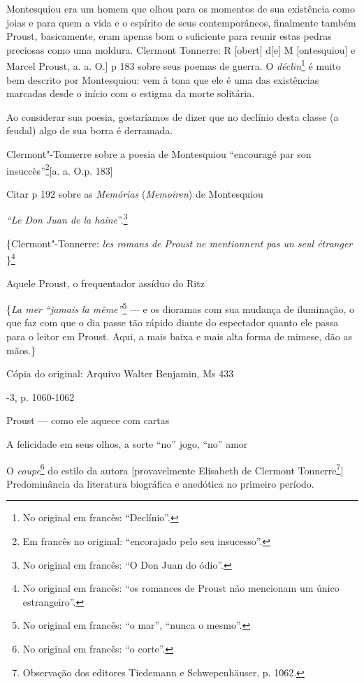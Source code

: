 Montesquiou era um homem que olhou para os momentos de sua existência
como joias e para quem a vida e o espírito de seus contemporâneos,
finalmente também Proust, basicamente, eram apenas bom o suficiente para
reunir estas pedras preciosas como uma moldura. Clermont Tonnerre: R
{[}obert{]} d{[}e{]} M {[}ontesquiou{]} e Marcel Proust, a. a. O.{]} p
183 sobre seus poemas de guerra. O \emph{déclin}\footnote{No
  original em francês: ``Declínio''. \versal{[N. T.]}} é muito bem descrito por
Montesquiou: vem à tona que ele é uma das existências marcadas desde o
início com o estigma da morte solitária.

Ao considerar sua poesia, gostaríamos de dizer que no declínio desta
classe (a feudal) algo de sua borra é derramada.

Clermont"-Tonnerre sobre a poesia de Montesquiou ``encouragé par son
insuccès''\footnote{Em francês no original: ``encorajado pelo seu insucesso''. \versal{[N. T.]}}{[}a. a. O.p. 183{]}

Citar p 192 sobre as \emph{Memórias} (\emph{Memoiren}) de Montesquiou

\emph{``Le Don Juan de la haine}''.\footnote{No original em
  francês: ``O Don Juan do ódio''. \versal{[N. T.]}}

\{Clermont"-Tonnerre: \emph{les romans de Proust ne mentionnent pas un
seul étranger} \}\footnote{No original em francês: ``os romances
  de Proust não mencionam um único estrangeiro''. \versal{[N. T.]}}

Aquele Proust, o frequentador assíduo do Ritz

\{\emph{La mer ``jamais la même''}\footnote{No original em francês: ``o mar'', ``nunca o mesmo''. \versal{[N. T.]}} --- e os dioramas com sua
mudança de iluminação, o que faz com que o dia passe tão rápido diante
do espectador quanto ele passa para o leitor em Proust. Aqui, a mais
baixa e mais alta forma de mimese, dão as mãos.\}

Cópia do original: Arquivo Walter Benjamin, Ms 433

-3, p. 1060-1062

Proust --- como ele aquece com cartas

A felicidade em seus olhos, a sorte ``no'' jogo, ``no'' amor

O \emph{coupe}\footnote{No original em francês: ``o corte''. \versal{[N. T.]}} do
estilo da autora {[}provavelmente Elisabeth de Clermont
Tonnerre\footnote{Observação dos editores Tiedemann e
  Schwepenhäuser, p. 1062. \versal{[N. E.]}}{]} Predominância da literatura biográfica e
anedótica no primeiro período.

